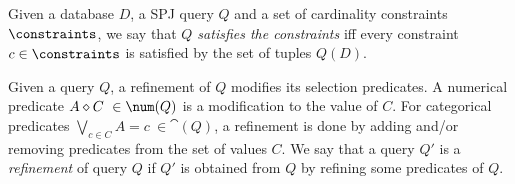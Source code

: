\begin{definition}
    Given a database $D$, a SPJ query $Q$ and a set of cardinality constraints $\constraints$, we say that {\it $Q$ satisfies the constraints} iff every constraint $c \in \constraints$ is satisfied by the set of tuples $Q(D)$.
\end{definition}
\begin{definition}
    Given a query $Q$, a refinement of $Q$ modifies its selection predicates. A numerical predicate $A \diamond C~\in \num(Q)$ is a modification to the value of $C$. For categorical predicates $\bigvee_{c \in C} A = c~ \in \cat(Q)$, a refinement is done by adding and/or removing predicates from the set of values $C$.  We  say that a query $Q'$ is a \emph{refinement} of query $Q$ if $Q'$ is obtained from $Q$ by refining some predicates of $Q$.
\end{definition}
